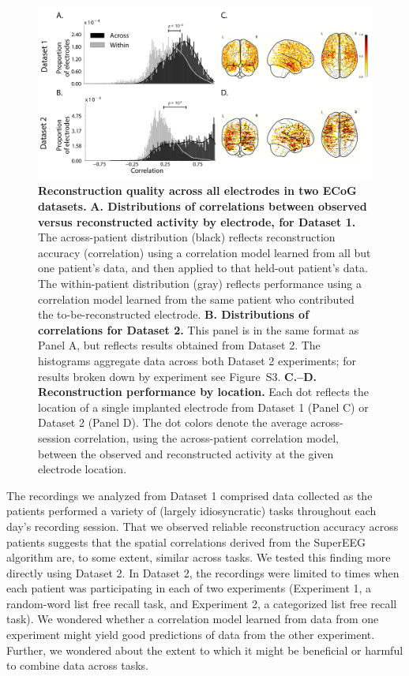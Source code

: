 \documentclass[11pt]{article}
\newcommand{\perexptaskreconseparated}{S3}
\begin{document}
\begin{figure}
  \centering
  \includegraphics[width=\textwidth]{figs/corrmap}
  \caption{\textbf{Reconstruction quality across all electrodes in two
      ECoG datasets.}  \textbf{A. Distributions of correlations
      between observed versus reconstructed activity by electrode, for
      Dataset 1.}  The across-patient distribution (black) reflects
    reconstruction accuracy (correlation) using a correlation model
    learned from all but one patient's data, and then applied to that
    held-out patient's data.  The within-patient distribution (gray)
    reflects performance using a correlation model learned from the same
    patient who contributed the to-be-reconstructed electrode.
    \textbf{B. Distributions of correlations for Dataset 2.}  This
    panel is in the same format as Panel A, but reflects results
    obtained from Dataset 2.  The histograms aggregate data across
    both Dataset 2 experiments; for results broken down by experiment
    see Figure~\perexptaskreconseparated. \textbf{C.--D.  Reconstruction
      performance by location.} Each dot reflects the location of a
    single implanted electrode from Dataset 1 (Panel C) or Dataset 2
    (Panel D).  The dot colors denote the average across-session
    correlation, using the across-patient correlation model, between
    the observed and reconstructed activity at the given electrode
    location.}
  \label{fig:corrmap}
\end{figure}

The recordings we analyzed from Dataset 1 comprised data collected as
the patients performed a variety of (largely idiosyncratic) tasks
throughout each day's recording session.  That we observed reliable
reconstruction accuracy across patients suggests that the spatial
correlations derived from the SuperEEG algorithm are, to some extent,
similar across tasks.  We tested this finding more directly using
Dataset 2.  In Dataset 2, the recordings were limited to times when
each patient was participating in each of two experiments (Experiment
1, a random-word list free recall task, and Experiment 2, a
categorized list free recall task).  We wondered whether a correlation
model learned from data from one experiment might yield good
predictions of data from the other experiment.  Further, we wondered
about the extent to which it might be beneficial or harmful to combine
data across tasks.
\end{document}
